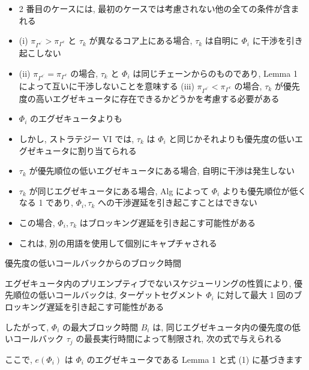 \begin{frame}{}
    \begin{itemize}
        \item 2 番目のケースには, 最初のケースでは考慮されない他の全ての条件が含まれる
        \item (i) $\pi_{\Gamma^{c^{\prime}}}>\pi_{\Gamma^{c}}$ と $\tau_{k}$ が異なるコア上にある場合, $\tau_{k}$ は自明に $\Phi_{i}$ に干渉を引き起こしない
        \item (ii) $\pi_{\Gamma^{c^{\prime}}}=\pi_{\Gamma^{c}}$ の場合, $\tau_{k}$ と $\Phi_{i}$ は同じチェーンからのものであり, Lemma 1 によって互いに干渉しないことを意味する (iii) $\pi_{\Gamma^{c^{\prime}}}<\pi_{\Gamma^{c}}$ の場合, $\tau_{k}$ が優先度の高いエグゼキュータに存在できるかどうかを考慮する必要がある
        \item $\Phi_{i}$ のエグゼキュータよりも
    \end{itemize}
\end{frame}

\begin{frame}{}
    \begin{itemize}
        \item しかし, ストラテジー VI では, $\tau_{k}$ は $\Phi_{i}$ と同じかそれよりも優先度の低いエグゼキュータに割り当てられる
        \item $\tau_{k}$ が優先順位の低いエグゼキュータにある場合, 自明に干渉は発生しない
        \item $\tau_{k}$ が同じエグゼキュータにある場合, Alg によって $\Phi_{i}$ よりも優先順位が低くなる 1 であり, $\Phi_{i} ,  \tau_{k}$ への干渉遅延を引き起こすことはできない
        \item この場合, $\Phi_{i} ,  \tau_{k}$ はブロッキング遅延を引き起こす可能性がある
        \item これは, 別の用語を使用して個別にキャプチャされる
    \end{itemize}
\end{frame}

\begin{frame}{}
    優先度の低いコールバックからのブロック時間
    \item エグゼキュータ内のプリエンプティブでないスケジューリングの性質により, 優先順位の低いコールバックは, ターゲットセグメント $\Phi_{i}$ に対して最大 1 回のブロッキング遅延を引き起こす可能性がある
    \item したがって, $\Phi_{i}$ の最大ブロック時間 $B_{i}$ は, 同じエグゼキュータ内の優先度の低いコールバック $\tau_{j}$ の最長実行時間によって制限され, 次の式で与えられる

    ここで, $e\left(\Phi_{i}\right)$ は $\Phi_{i}$ のエグゼキュータである
    Lemma 1 と式 (1) に基づきます
\end{frame}


